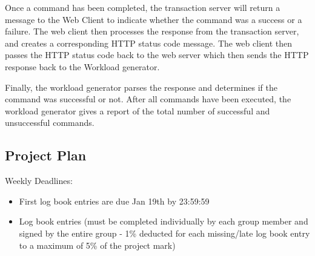 \documentclass[a4paper,10pt]{article}
\begin{document}
Once a command has been completed, the transaction server will return a message 
to the Web Client to indicate whether the command was a success or a failure. 
The web client then processes the response from the transaction server, and 
creates a corresponding HTTP status code message. The web client then passes the 
HTTP status code back to the web server which then sends the HTTP response back 
to the Workload generator. 

Finally, the workload generator parses the response and determines if the 
command was successful or not. After all commands have been executed, the 
workload generator gives a report of the total number of successful and 
unsuccessful commands.

\subsection{Project Plan}

Weekly Deadlines:
\begin{itemize}
\item First log book entries are due Jan 19th by 23:59:59
\item Log book entries (must be completed individually by each group member and 
signed by the entire group - 1\% deducted for each missing/late log book entry 
to a maximum of 5\% of the project mark)
\end{itemize}
\end{document}
